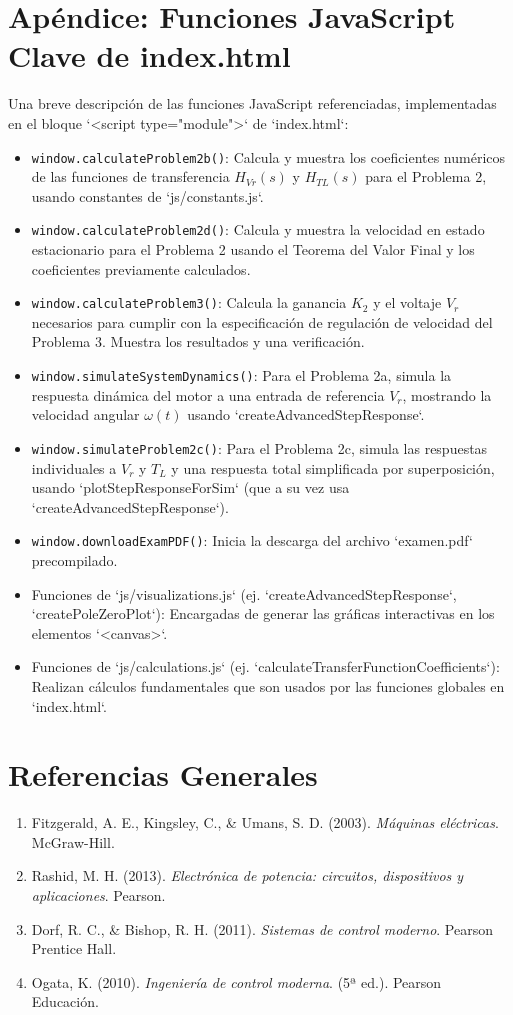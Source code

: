 \documentclass[12pt]{article}
\begin{document}
\section*{Apéndice: Funciones JavaScript Clave de index.html}
Una breve descripción de las funciones JavaScript referenciadas, implementadas en el bloque `<script type="module">` de `index.html`:\n
\begin{itemize}
    \item \texttt{window.calculateProblem2b()}: Calcula y muestra los coeficientes numéricos de las funciones de transferencia $H_{Vr}(s)$ y $H_{TL}(s)$ para el Problema 2, usando constantes de `js/constants.js`.\n
    \item \texttt{window.calculateProblem2d()}: Calcula y muestra la velocidad en estado estacionario para el Problema 2 usando el Teorema del Valor Final y los coeficientes previamente calculados.\n
    \item \texttt{window.calculateProblem3()}: Calcula la ganancia $K_2$ y el voltaje $V_r$ necesarios para cumplir con la especificación de regulación de velocidad del Problema 3. Muestra los resultados y una verificación.\n
    \item \texttt{window.simulateSystemDynamics()}: Para el Problema 2a, simula la respuesta dinámica del motor a una entrada de referencia $V_r$, mostrando la velocidad angular $\omega(t)$ usando `createAdvancedStepResponse`.\n
    \item \texttt{window.simulateProblem2c()}: Para el Problema 2c, simula las respuestas individuales a $V_r$ y $T_L$ y una respuesta total simplificada por superposición, usando `plotStepResponseForSim` (que a su vez usa `createAdvancedStepResponse`).\n
    \item \texttt{window.downloadExamPDF()}: Inicia la descarga del archivo `examen.pdf` precompilado.\n
    \item Funciones de `js/visualizations.js` (ej. `createAdvancedStepResponse`, `createPoleZeroPlot`): Encargadas de generar las gráficas interactivas en los elementos `<canvas>`.\n
    \item Funciones de `js/calculations.js` (ej. `calculateTransferFunctionCoefficients`): Realizan cálculos fundamentales que son usados por las funciones globales en `index.html`.\n
\end{itemize}\n

\section*{Referencias Generales}\n
\begin{enumerate}[label=\arabic*.]\n
    \item Fitzgerald, A. E., Kingsley, C., \& Umans, S. D. (2003). \textit{Máquinas eléctricas}. McGraw-Hill.\n
    \item Rashid, M. H. (2013). \textit{Electrónica de potencia: circuitos, dispositivos y aplicaciones}. Pearson.\n
    \item Dorf, R. C., \& Bishop, R. H. (2011). \textit{Sistemas de control moderno}. Pearson Prentice Hall.\n
    \item Ogata, K. (2010). \textit{Ingeniería de control moderna}. (5ª ed.). Pearson Educación.\n
\end{enumerate}\n
\end{document}
